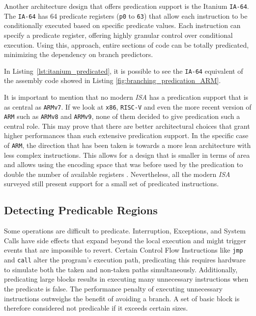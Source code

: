 Another architecture design that offers predication support is the Itanium \texttt{IA-64}.
The \texttt{IA-64} has 64 predicate registers (\texttt{p0} to \texttt{63}) that allow each instruction to be conditionally executed based on specific predicate values. Each instruction can specify a predicate register, offering highly granular control over conditional execution. Using this, approach, entire sections of code can be totally predicated, minimizing the dependency on branch predictors.

\begin{center}
\begin{minipage}{0.5\textwidth}

\end{minipage}
\end{center}

In Listing~\ref{lst:itanium_predicated}, it is possible to see the \texttt{IA-64} equivalent of the assembly code showed in Listing \ref{fig:branching_predication_ARM}.

It is important to mention that no modern \textit{ISA} has a predication support that is as central as \texttt{ARMv7}. If we look at \texttt{x86}, \texttt{RISC-V} and even the more recent version of \texttt{ARM} such as \texttt{ARMv8} and \texttt{ARMv9}, none of them decided to give predication such a central role.
This may prove that there are better architectural choices that grant higher performances than such extensive predication support.
In the specific case of \texttt{ARM}, the direction that has been taken is towards a more lean architecture with less complex instructions. This allows for a design that is smaller in terms of area and allows using the encoding space that was before used by the predication to double the number of available registers \cite{armv8_instruction_removal}. 
Nevertheless, all the modern \textit{ISA} surveyed still present support for a small set of predicated instructions.

\subsection{Detecting Predicable Regions}
\label{sec:detecting_pred}

Some operations are difficult to predicate. Interruption, Exceptions, and System Calls have side effects that expand beyond the local execution and might trigger events that are impossible to revert. Certain Control Flow Instructions like \texttt{jmp} and \texttt{call} alter the program's execution path, predicating this requires hardware to simulate both the taken and non-taken paths simultaneously.
Additionally, predicating large blocks results in executing many unnecessary instructions when the predicate is false. The performance penalty of executing unnecessary instructions outweighs the benefit of avoiding a branch. A set of basic block is therefore considered not predicable if it exceeds certain sizes.

